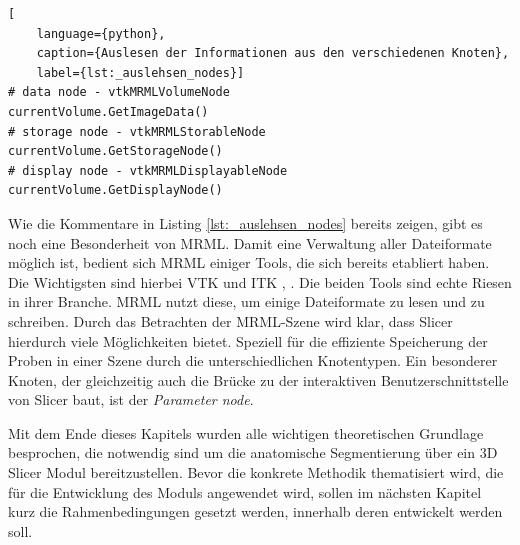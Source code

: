 \begin{lstlisting}[
	language={python},
	caption={Auslesen der Informationen aus den verschiedenen Knoten},
	label={lst:_auslehsen_nodes}]
# data node - vtkMRMLVolumeNode
currentVolume.GetImageData()
# storage node - vtkMRMLStorableNode
currentVolume.GetStorageNode()
# display node - vtkMRMLDisplayableNode
currentVolume.GetDisplayNode()
\end{lstlisting}

Wie die Kommentare in Listing \ref{lst:_auslehsen_nodes} bereits zeigen, gibt es
noch eine Besonderheit von \ac{MRML}. Damit eine Verwaltung aller Dateiformate möglich
ist, bedient sich \ac{MRML} einiger Tools, die sich bereits etabliert haben. Die
Wichtigsten sind hierbei \ac{VTK} und \ac{ITK} \citep[vgl.][K.~1.1]{vtk2006}, \citep[vgl.][K.~1.1]{itkguide2015}.
Die beiden Tools sind echte Riesen in ihrer Branche. \ac{MRML} nutzt diese, um
einige Dateiformate zu lesen und zu schreiben. Durch das Betrachten der \ac{MRML}-Szene
wird klar, dass Slicer hierdurch viele Möglichkeiten bietet. Speziell für die
effiziente Speicherung der Proben in einer Szene durch die unterschiedlichen
Knotentypen. Ein besonderer Knoten, der gleichzeitig auch die Brücke zu der
interaktiven Benutzerschnittstelle von Slicer baut, ist der \textit{Parameter
node}.

Mit dem Ende dieses Kapitels wurden alle wichtigen theoretischen Grundlage
besprochen, die notwendig sind um die anatomische Segmentierung über ein 3D Slicer
Modul bereitzustellen. Bevor die konkrete Methodik thematisiert wird, die für die
Entwicklung des Moduls angewendet wird, sollen im nächsten Kapitel kurz die
Rahmenbedingungen gesetzt werden, innerhalb deren entwickelt werden soll.
